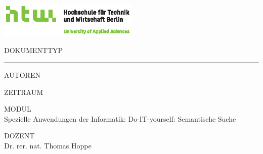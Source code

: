 \begin{titlepage}
	\includegraphics[width=0.50\textwidth]{img/Q01_HTW_Berlin_Logo_quer_pos_FARBIG_CMYK.eps}

	\vspace{4.0cm}

	\begin{changemargin}{0.5cm}{0.0cm}
		\color{htwgrau}
		\normalsize
		\textsf{\noindent\MakeUppercase{Dokumenttyp}} \vspace{-20pt}\\

		\noindent\rule{\textwidth}{0.5pt}\vspace{-4pt}

		\color{black}
		\huge
		\textsf{\thetitle}
		\vspace{12pt}

		\color{htwgrau}
		\normalsize
		\textsf{\MakeUppercase{Autoren}}\\
		\color{black}
		\large
		\textsf{\theauthor}

		\vfill

		\color{htwgrau}
		\normalsize
		\textsf{\MakeUppercase{Zeitraum}}\\
		\color{black}
		\large
		\textsf{\thedate}

		\color{htwgrau}
		\normalsize
		\textsf{\MakeUppercase{Modul}}\\
		\color{black}
		\large
		\textsf{Spezielle Anwendungen der Informatik: Do-IT-yourself: Semantische Suche}

		\color{htwgrau}
		\normalsize
		\textsf{\MakeUppercase{Dozent}}\\
		\color{black}
		\large
		\textsf{Dr. rer. nat. Thomas Hoppe}



	\end{changemargin}
\end{titlepage}